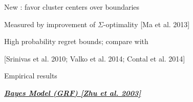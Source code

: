 \documentclass[size36_42,landscape]{a0poster}
\def\tikzmark#1{\tikz[remember picture,overlay]\coordinate(#1);}
\newenvironment{coldinglist}[2]	    {
\begin{list}
  {\textcolor{#2}{\ding{#1}}}{
\setlength{\parskip}{0pt}
\setlength{\itemsep}{0pt}
\setlength{\parsep}{0pt}
}
	}
	{\end{list}}
\def\bff{{\bf f}}
\newcommand{\paragraphHeader}[1]{\vspace{1cm}\par{\LARGE\bf\color{darkpastelgreen} \it{\underline{\hspace{.5em}#1\hspace{.5em}}}}\par\vspace{1cm}}
\begin{document}
\begin{multicols}{3}

\begin{coldinglist}{112}{blue}
\item New : favor cluster centers over boundaries
\begin{coldinglist}{123}{blue}
    \item Measured by improvement of $\Sigma$-optimality [Ma et al. 2013]
\end{coldinglist}
\item High probability regret bounds; compare with
\begin{coldinglist}{123}{blue}
    \item{} [Srinivas et al. 2010; Valko et al. 2014; Contal et al. 2014]
\end{coldinglist}
\item Empirical results
\end{coldinglist}







   

\vfill
\columnbreak

\paragraphHeader{Bayes Model (GRF) [Zhu et al. 2003]}
\newcommand{\bmu}{\boldsymbol{\mu}}
\newcommand{\bC}{\mathbf{C}}
\newcommand{\bA}{\mathbf{A}}
\newcommand{\bD}{\mathbf{D}}
\newcommand{\cLap}{\boldsymbol{\mathcal{L}}}
\newcommand{\bH}{\mathbf{H}}
\newcommand{\bI}{\mathbf{I}}


\newcommand{\highlight}[2][yellow]{\mathchoice%
  {\colorbox{#1}{$\displaystyle#2$}}%
  {\colorbox{#1}{$\textstyle#2$}}%
  {\colorbox{#1}{$\scriptstyle#2$}}%
  {\colorbox{#1}{$\scriptscriptstyle#2$}}}%



\end{multicols}
\end{document}
